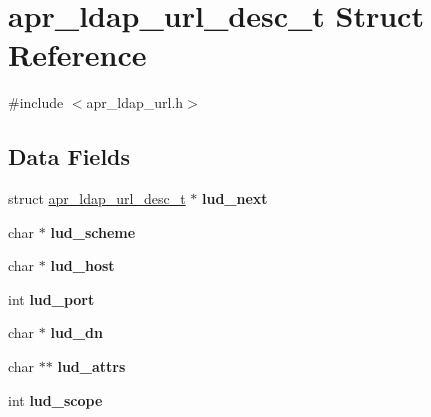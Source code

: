 \hypertarget{structapr__ldap__url__desc__t}{\section{apr\-\_\-ldap\-\_\-url\-\_\-desc\-\_\-t Struct Reference}
\label{structapr__ldap__url__desc__t}
}


{\ttfamily \#include $<$apr\-\_\-ldap\-\_\-url.\-h$>$}

\subsection*{Data Fields}
\begin{DoxyCompactItemize}
\item 
\hypertarget{structapr__ldap__url__desc__t_acdac8d10a9d382d0c71191dfaf3fb235}{struct \hyperlink{structapr__ldap__url__desc__t}{apr\-\_\-ldap\-\_\-url\-\_\-desc\-\_\-t} $\ast$ {\bfseries lud\-\_\-next}}\label{structapr__ldap__url__desc__t_acdac8d10a9d382d0c71191dfaf3fb235}

\item 
\hypertarget{structapr__ldap__url__desc__t_ab9f34b6b33a96d63483528667cb2681d}{char $\ast$ {\bfseries lud\-\_\-scheme}}\label{structapr__ldap__url__desc__t_ab9f34b6b33a96d63483528667cb2681d}

\item 
\hypertarget{structapr__ldap__url__desc__t_a6c38635691b9a335723796493bee9435}{char $\ast$ {\bfseries lud\-\_\-host}}\label{structapr__ldap__url__desc__t_a6c38635691b9a335723796493bee9435}

\item 
\hypertarget{structapr__ldap__url__desc__t_af7dc609e7ece6d8da58fc8d8a7adb969}{int {\bfseries lud\-\_\-port}}\label{structapr__ldap__url__desc__t_af7dc609e7ece6d8da58fc8d8a7adb969}

\item 
\hypertarget{structapr__ldap__url__desc__t_a9f18ffe1b11b0fb7cbe71a6b1aebb0b5}{char $\ast$ {\bfseries lud\-\_\-dn}}\label{structapr__ldap__url__desc__t_a9f18ffe1b11b0fb7cbe71a6b1aebb0b5}

\item 
\hypertarget{structapr__ldap__url__desc__t_ac1b5de93dafa87213ce9ac9b4a1661b7}{char $\ast$$\ast$ {\bfseries lud\-\_\-attrs}}\label{structapr__ldap__url__desc__t_ac1b5de93dafa87213ce9ac9b4a1661b7}

\item 
\hypertarget{structapr__ldap__url__desc__t_a3e29214afb4c3b777562093c0d84ce94}{int {\bfseries lud\-\_\-scope}}\label{structapr__ldap__url__desc__t_a3e29214afb4c3b777562093c0d84ce94}


\end{DoxyCompactItemize}
